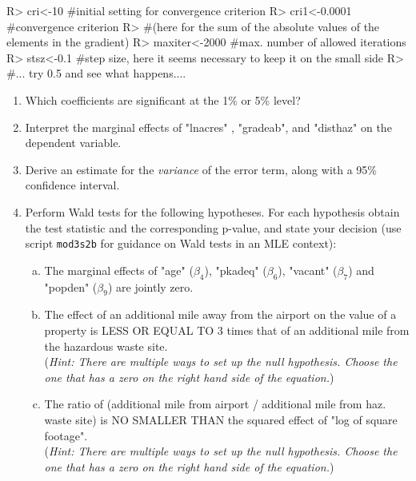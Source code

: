 \documentclass[11pt,reqno]{amsart}   %
\newcommand{\ksp}{\vspace{0.1in}}   %
\begin{document}
\ksp
\begin{Schunk}
\begin{Sinput}
R> cri<-10        #initial setting for convergence criterion
R> cri1<-0.0001    #convergence criterion 
R> #(here for the sum of the absolute values of the elements in the gradient)
R> maxiter<-2000   #max. number of allowed iterations
R> stsz<-0.1      #step size, here it seems necessary to keep it on the small side 
R> #... try 0.5 and see what happens....
\end{Sinput}
\end{Schunk}
\ksp
\begin{enumerate}[(1)]
\item Which coefficients are significant at the 1\% or 5\% level?
\item Interpret the marginal effects of "lnacres" , "gradeab", and "disthaz" on the dependent variable.
\item Derive an estimate for the \emph{variance} of the error term, along with a 95\% confidence interval.
\item Perform Wald tests for the following hypotheses. For each hypothesis obtain the test statistic and the corresponding p-value, and state your decision (use script \texttt{mod3s2b} for guidance on Wald tests in an MLE context):\\

    \begin{enumerate} [(a)]
    \item The marginal effects of "age" ($\beta_4$), "pkadeq" ($\beta_6$), "vacant" ($\beta_7$) and "popden" ($\beta_9$) are jointly zero.
    \item The effect of an additional mile away from the airport on the value of a property 
is LESS OR EQUAL TO 3 times that of an additional mile from the hazardous waste site.\\
(\emph{Hint: There are multiple ways to set up the null hypothesis. Choose the one that has a zero on the right hand side of the equation.})
    \item The ratio of (additional mile from airport / additional mile from haz. waste site) 
is NO SMALLER THAN the squared effect of "log of square footage".\\
(\emph{Hint: There are multiple ways to set up the null hypothesis. Choose the one that has a zero on the right hand side of the equation.})
    \end{enumerate}
    
\end{enumerate}
\end{document}
